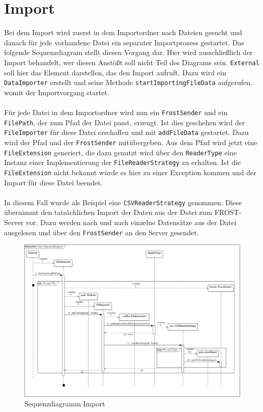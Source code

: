 {{{{{\section{Import}
Bei dem Import wird zuerst in dem Importordner nach Dateien gesucht und danach für jede vorhandene Datei ein separater Importprozess gestartet. Das folgende Sequenzdiagram stellt diesen Vorgang dar. Hier wird ausschließlich der Import behandelt, wer diesen Anstößt soll nicht Teil des Diagrams sein. \texttt{External} soll hier das Element darstellen, das den Import aufruft. Dazu wird ein \texttt{DataImporter} erstellt und seine Methode \texttt{startImportingFileData} aufgerufen, womit der Importvorgang startet.\\\\
Für jede Datei in dem Importordner wird nun ein \texttt{FrostSender} und ein \texttt{FilePath}, der zum Pfad der Datei passt, erzeugt. Ist dies geschehen wird der \texttt{FileImporter} für diese Datei erschaffen und mit \texttt{addFileData} gestartet. Dazu wird der Pfad und der \texttt{FrostSender} mitübergeben. Aus dem Pfad wird jetzt eine \texttt{FileExtension} generiert, die dazu genutzt wird über den \texttt{ReaderType} eine Instanz einer Implementierung der \texttt{FileReaderStrategy} zu erhalten. Ist die \texttt{FileExtension} nicht bekannt würde es hier zu einer Exception kommen und der Import für diese Datei beendet.\\\\
In diesem Fall wurde als Beispiel eine \texttt{CSVReaderStrategy} genommen. Diese übernimmt den tatsächlichen Import der Daten aus der Datei zum FROST-Server vor. Dazu werden nach und nach einzelne Datensätze aus der Datei ausgelesen und über den \texttt{FrostSender} an den Server gesendet.
\begin{figure}[!hbp]
	\centering
	\includegraphics[width=0.9\linewidth]{images/import/ImportSequenceDiagram.png}
	\caption{Sequenzdiagramm Import}
\end{figure}
\newpage

}}}}}
